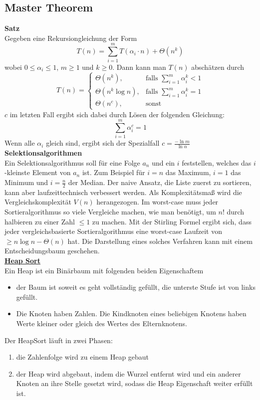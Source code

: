 \documentclass[a4paper, 12pt]{article}
\begin{document}
	\subsection{Master Theorem}
	\textbf{Satz}\\
	Gegeben eine Rekursiongleichung der Form \[T(n) = \sum_{i=1}^m T(\alpha_i\cdot n) + \Theta(n^k)\] wobei $0 \leq \alpha_i \leq 1$, $m\geq 1$ und $k\geq 0$. Dann kann man $T(n)$ abschätzen durch \[T(n) = \begin{cases}
		\Theta(n^k), & \text{falls } \sum_{i=1}^m \alpha_i^k < 1\\
		\Theta(n^k \log n), & \text{falls } \sum_{i=1}^m \alpha_i^k = 1\\
		\Theta(n^c), & \text{sonst}
	\end{cases}\]
	$c$ im letzten Fall ergibt sich dabei durch Lösen der folgenden Gleichung: \[\sum_{i=1}^m \alpha_i^c = 1\] Wenn alle $\alpha_i$ gleich sind, ergibt sich der Spezialfall $c = \frac{-\ln m}{\ln \alpha}$\\
	\textbf{Selektionsalgorithmen}\\
	Ein Selektionsalgorithmus soll für eine Folge $a_n$ und ein $i$ feststellen, welches das $i$-kleinste Element von $a_n$ ist. Zum Beispiel für $i=n$ das Maximum, $i=1$ das Minimum und $i=\frac{n}{2}$ der Median. Der naive Ansatz, die Liste zuerst zu sortieren, kann aber laufzeittechnisch verbessert werden. Als Komplexitätsmaß wird die Vergleichskomplexität $V(n)$ herangezogen. Im worst-case muss jeder Sortieralgorithmus so viele Vergleiche machen, wie man benötigt, um $n!$ durch halbieren zu einer Zahl $\leq 1$ zu machen. Mit der Stirling Formel ergibt sich, dass jeder vergleichsbasierte Sortieralgorithmus eine worst-case Laufzeit von $\geq n\log n - \Theta(n)$ hat. Die Darstellung eines solches Verfahren kann mit einem Entscheidungsbaum geschehen.\\
	\underline{\textbf{Heap Sort}}\\
	Ein Heap ist ein Binärbaum mit folgenden beiden Eigenschaftem \begin{itemize}
		\item der Baum ist soweit es geht vollständig gefüllt, die unterste Stufe ist von links gefüllt.
		\item Die Knoten haben Zahlen. Die Kindknoten eines beliebigen Knotens haben Werte kleiner oder gleich des Wertes des Elternknotens.
	\end{itemize}
	Der HeapSort läuft in zwei Phasen: \begin{enumerate}
		\item die Zahlenfolge wird zu einem Heap gebaut
		\item der Heap wird abgebaut, indem die Wurzel entfernt wird und ein anderer Knoten an ihre Stelle gesetzt wird, sodass die Heap Eigenschaft weiter erfüllt ist.
	\end{enumerate}
\end{document}
